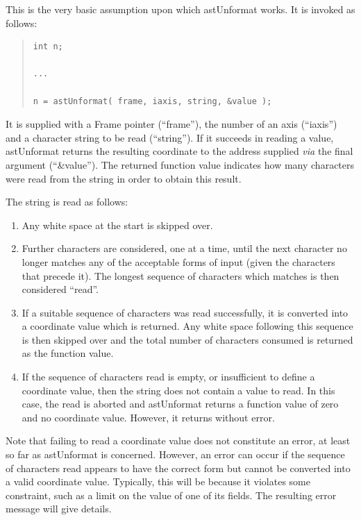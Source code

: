 \documentclass[twoside,11pt]{article}
\begin{document}
This is the very basic assumption upon which astUnformat works. It is
invoked as follows:

\begin{quote}
\small
\begin{verbatim}
int n;

...

n = astUnformat( frame, iaxis, string, &value );
\end{verbatim}
\normalsize
\end{quote}

It is supplied with a Frame pointer (``frame''), the number of an axis
(``iaxis'') and a character string to be read (``string''). If it
succeeds in reading a value, astUnformat returns the resulting
coordinate to the address supplied {\em{via}} the final argument
(``\&value''). The returned function value indicates how many
characters were read from the string in order to obtain this result.

The string is read as follows:

\begin{enumerate}
\item Any white space at the start is skipped over.

\item Further characters are considered, one at a time, until the next
character no longer matches any of the acceptable forms of input
(given the characters that precede it). The longest sequence of
characters which matches is then considered ``read''.

\item If a suitable sequence of characters was read successfully, it
is converted into a coordinate value which is returned. Any white
space following this sequence is then skipped over and the total
number of characters consumed is returned as the function value.

\item If the sequence of characters read is empty, or insufficient to
define a coordinate value, then the string does not contain a value to
read. In this case, the read is aborted and astUnformat returns a
function value of zero and no coordinate value.  However, it returns
without error.
\end{enumerate}

Note that failing to read a coordinate value does not constitute an
error, at least so far as astUnformat is concerned. However, an error
can occur if the sequence of characters read appears to have the
correct form but cannot be converted into a valid coordinate
value. Typically, this will be because it violates some constraint,
such as a limit on the value of one of its fields. The resulting error
message will give details.
\end{document}
